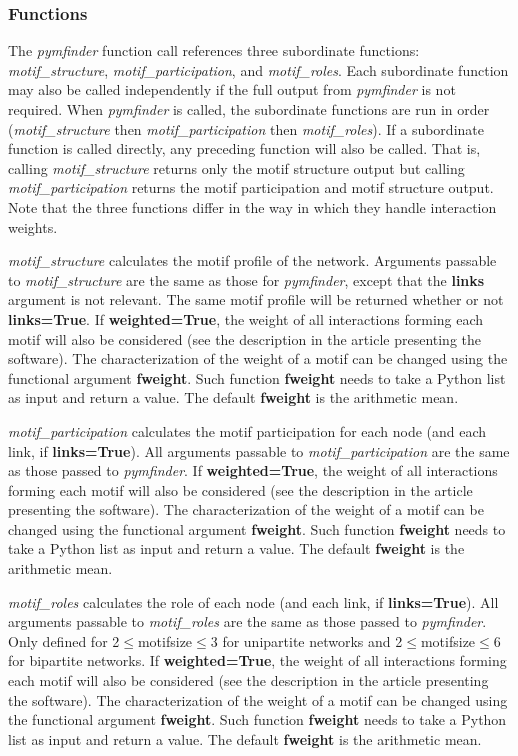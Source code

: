 \documentclass[12pt]{article}
\begin{document}
		\subsubsection{Functions}
			The \emph{pymfinder} function call references three subordinate functions: \emph{motif\_structure}, \emph{motif\_participation}, and \emph{motif\_roles}. Each subordinate function may also be called independently if the full output from \emph{pymfinder} is not required. When \emph{pymfinder} is called, the subordinate functions are run in order (\emph{motif\_structure} then \emph{motif\_participation} then \emph{motif\_roles}). If a subordinate function is called directly, any preceding function will also be called. That is, calling \emph{motif\_structure} returns only the motif structure output but calling \emph{motif\_participation} returns the motif participation and motif structure output. Note that the three functions differ in the way in which they handle interaction weights.

			\emph{motif\_structure} calculates the motif profile of the network. Arguments passable to \emph{motif\_structure} are the same as those for \emph{pymfinder}, except that the \textbf{links} argument is not relevant. The same motif profile will be returned whether or not \textbf{links=True}. If \textbf{weighted=True}, the weight of all interactions forming each motif will also be considered (see the description in the article presenting the software). The characterization of the weight of a motif can be changed using the functional argument \textbf{fweight}. Such function \textbf{fweight} needs to take a Python list as input and return a value. The default \textbf{fweight} is the arithmetic mean.

			\emph{motif\_participation} calculates the motif participation for each node (and each link, if \textbf{links=True}). All arguments passable to \emph{motif\_participation} are the same as those passed to \emph{pymfinder}. If \textbf{weighted=True}, the weight of all interactions forming each motif will also be considered (see the description in the article presenting the software). The characterization of the weight of a motif can be changed using the functional argument \textbf{fweight}. Such function \textbf{fweight} needs to take a Python list as input and return a value. The default \textbf{fweight} is the arithmetic mean.

			\emph{motif\_roles} calculates the role of each node (and each link, if \textbf{links=True}). All arguments passable to \emph{motif\_roles} are the same as those passed to \emph{pymfinder}. Only defined for 2$\leq$motifsize$\leq$3 for unipartite networks and 2$\leq$motifsize$\leq$6 for bipartite networks. If \textbf{weighted=True}, the weight of all interactions forming each motif will also be considered (see the description in the article presenting the software). The characterization of the weight of a motif can be changed using the functional argument \textbf{fweight}. Such function \textbf{fweight} needs to take a Python list as input and return a value. The default \textbf{fweight} is the arithmetic mean.
\end{document}
